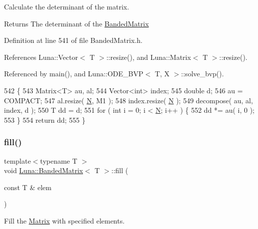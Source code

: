 Calculate the determinant of the matrix. 

\begin{DoxyReturn}{Returns}
The determinant of the \hyperlink{classLuna_1_1BandedMatrix}{Banded\+Matrix} 
\end{DoxyReturn}


Definition at line 541 of file Banded\+Matrix.\+h.



References Luna\+::\+Vector$<$ T $>$\+::resize(), and Luna\+::\+Matrix$<$ T $>$\+::resize().



Referenced by main(), and Luna\+::\+O\+D\+E\+\_\+\+B\+V\+P$<$ T, X $>$\+::solve\+\_\+bvp().


\begin{DoxyCode}
542   \{
543     Matrix<T> au, al;
544     Vector<int> index;
545     \textcolor{keywordtype}{double} d;
546     au = COMPACT;
547     al.resize( \hyperlink{namespaceHeat__plot_a7d050092798e28458a263710837bda77}{N}, M1 );
548     index.resize( \hyperlink{namespaceHeat__plot_a7d050092798e28458a263710837bda77}{N} );
549     decompose( au, al, index, d );
550     T dd = d;
551     \textcolor{keywordflow}{for} ( \textcolor{keywordtype}{int} i = 0; i < \hyperlink{namespaceHeat__plot_a7d050092798e28458a263710837bda77}{N}; i++ ) \{
552       dd *= au( i, 0 );
553     \}
554     \textcolor{keywordflow}{return} dd;
555   \}
\end{DoxyCode}
\mbox{\label{classLuna_1_1BandedMatrix_a888b288370b9db1a4de0ea3cfc5a724c}} 
\subsubsection{\texorpdfstring{fill()}{fill()}}
{\footnotesize\ttfamily template$<$typename T $>$ \\
void \hyperlink{classLuna_1_1BandedMatrix}{Luna\+::\+Banded\+Matrix}$<$ T $>$\+::fill (\begin{DoxyParamCaption}\item[{const T \&}]{elem }\end{DoxyParamCaption})\hspace{0.3cm}{\ttfamily [inline]}}



Fill the \hyperlink{classLuna_1_1Matrix}{Matrix} with specified elements. 


